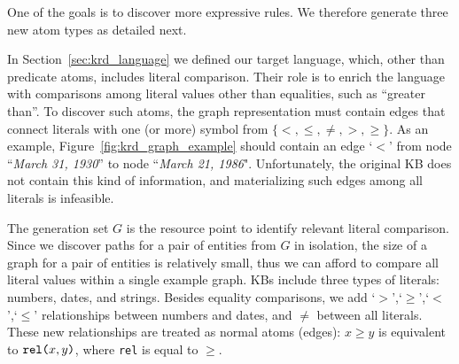 %

One of the goals is to discover more expressive rules. We therefore generate three new atom types as detailed next.

\noindent {}
In Section~\ref{sec:krd_language} we defined our target language, which, other than predicate atoms, includes literal comparison. 
Their role is to enrich the language with comparisons among literal values other than equalities, such as ``greater than''. 
To discover such atoms, the graph representation must contain edges that connect literals with one (or more) symbol from $\{<,\leq,\neq,>,\geq\}$. As an example, Figure~\ref{fig:krd_graph_example} should contain an edge `$<$' from node ``\textit{March 31, 1930}'' to node ``\textit{March 21, 1986}". Unfortunately, the original KB does not contain this kind of information, and materializing such edges among all literals is infeasible.

The generation set $G$ is the resource point to identify relevant literal comparison.
Since we discover paths for a pair of entities from $G$ in isolation, the size of a graph for a pair of entities is relatively small, thus we can afford to compare all literal values within a single example graph. 
KBs include three types of literals: numbers, dates, and strings. Besides equality comparisons, we add `$>$',`$\geq$',`$<$',`$\leq$' relationships between numbers and dates, and $\neq$ between all literals. These new relationships are treated as normal atoms (edges): $x \geq y$ is equivalent to $\texttt{rel(}x,y\texttt{)}$, where \texttt{rel} is equal to $\geq$. 

